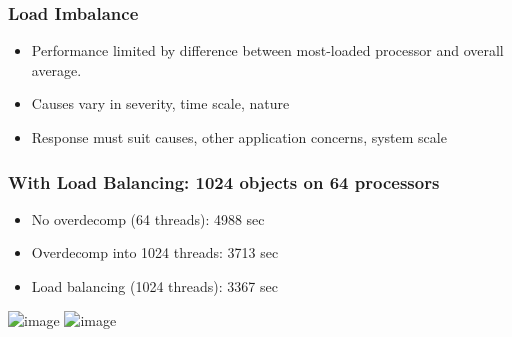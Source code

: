 


\begin{frame}
\frametitle{Load Imbalance}
\begin{itemize}
\item Performance limited by difference between most-loaded processor and overall average.\\
\pause
\item Causes vary in severity, time scale, nature
\pause
\item Response must suit causes, other application concerns, system scale
\end{itemize}
\end{frame}


\begin{frame}[fragile]
\frametitle{With Load Balancing: 1024 objects on 64 processors}
\begin{center}
\begin{itemize}
\item No overdecomp (64 threads): 4988 sec
\item Overdecomp into 1024 threads: 3713 sec
\item<2-> Load balancing (1024 threads): 3367 sec
\end{itemize}
\includegraphics<1>[width=0.9\textwidth]{../figures/usageVirtual.png}
\includegraphics<2>[width=0.8\textwidth]{../figures/usageLB.png}
\end{center}
\end{frame}


